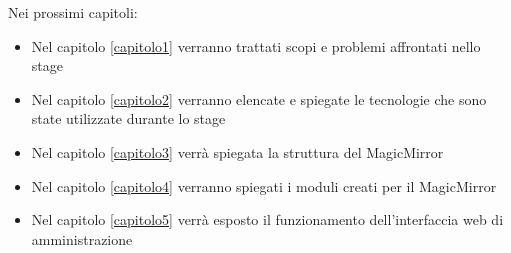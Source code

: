 Nei prossimi capitoli:
\begin{itemize}
\item Nel capitolo \ref{capitolo1} verranno trattati scopi e problemi affrontati nello stage
\item Nel capitolo \ref{capitolo2} verranno elencate e spiegate le tecnologie che sono state utilizzate
durante lo stage
\item Nel capitolo \ref{capitolo3} verr\`a spiegata la struttura del MagicMirror
\item Nel capitolo \ref{capitolo4} verranno spiegati i moduli creati per il MagicMirror
\item Nel capitolo \ref{capitolo5} verr\`a esposto il funzionamento dell'interfaccia web di amministrazione
\end{itemize}
